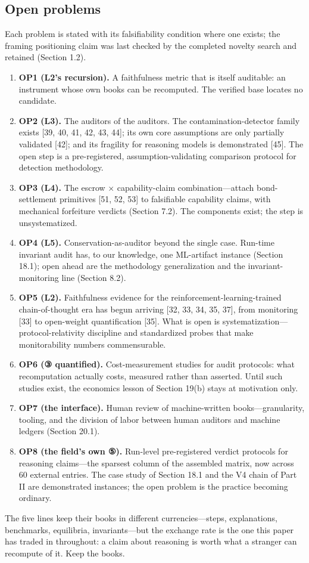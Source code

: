 \documentclass[11pt]{article}
\begin{document}
\subsection{Open problems}
\noindent Each problem is stated with its falsifiability condition where one exists; the framing positioning claim was last checked by the completed novelty search and retained (Section 1.2).\par
\begin{enumerate}[leftmargin=1.9em,itemsep=2pt,parsep=0pt,topsep=3pt]
\item \textbf{OP1 (L2's recursion).} A faithfulness metric that is itself auditable: an instrument whose own books can be recomputed. The verified base locates no candidate.
\item \textbf{OP2 (L3).} The auditors of the auditors. The contamination-detector family exists [39, 40, 41, 42, 43, 44]; its own core assumptions are only partially validated [42]; and its fragility for reasoning models is demonstrated [45]. The open step is a pre-registered, assumption-validating comparison protocol for detection methodology.
\item \textbf{OP3 (L4).} The escrow × capability-claim combination—attach bond-settlement primitives [51, 52, 53] to falsifiable capability claims, with mechanical forfeiture verdicts (Section 7.2). The components exist; the step is unsystematized.
\item \textbf{OP4 (L5).} Conservation-as-auditor beyond the single case. Run-time invariant audit has, to our knowledge, one ML-artifact instance (Section 18.1); open ahead are the methodology generalization and the invariant-monitoring line (Section 8.2).
\item \textbf{OP5 (L2).} Faithfulness evidence for the reinforcement-learning-trained chain-of-thought era has begun arriving [32, 33, 34, 35, 37], from monitoring [33] to open-weight quantification [35]. What is open is systematization—protocol-relativity discipline and standardized probes that make monitorability numbers commensurable.
\item \textbf{OP6 (③ quantified).} Cost-measurement studies for audit protocols: what recomputation actually costs, measured rather than asserted. Until such studies exist, the economics lesson of Section 19(b) stays at motivation only.
\item \textbf{OP7 (the interface).} Human review of machine-written books—granularity, tooling, and the division of labor between human auditors and machine ledgers (Section 20.1).
\item \textbf{OP8 (the field's own ⑤).} Run-level pre-registered verdict protocols for reasoning claims—the sparsest column of the assembled matrix, now across 60 external entries. The case study of Section 18.1 and the V4 chain of Part II are demonstrated instances; the open problem is the practice becoming ordinary.
\end{enumerate}
\noindent The five lines keep their books in different currencies—steps, explanations, benchmarks, equilibria, invariants—but the exchange rate is the one this paper has traded in throughout: a claim about reasoning is worth what a stranger can recompute of it. Keep the books.\par
\end{document}

